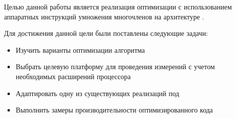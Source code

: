 
Целью данной работы является реализация оптимизации \crctt{}
с использованием аппаратных инструкций умножения многочленов на архитектуре \riscv{}.

Для достижения данной цели были поставлены следующие задачи:
\begin{itemize}
    \item Изучить варианты оптимизации алгоритма \crctt{}
    \item Выбрать целевую платформу для проведения измерений с учетом необходимых расширений процессора
    \item Адаптировать одну из существующих реализаций под \riscv
    \item Выполнить замеры производительности оптимизированного кода
\end{itemize}
